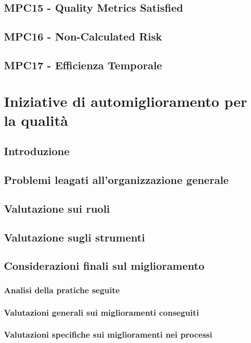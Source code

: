 \documentclass[italian,12pt]{article} %
\begin{document}
\subsection{MPC15 - Quality Metrics Satisfied}

\subsection{MPC16 - Non-Calculated Risk}

\subsection{MPC17 - Efficienza Temporale}

\section{Iniziative di automiglioramento per la qualità}

\subsection{Introduzione}

\subsection{Problemi leagati all’organizzazione generale}

\subsection{Valutazione sui ruoli}

\subsection*{Valutazione sugli strumenti}

\subsection{Considerazioni finali sul miglioramento}

\subsubsection{Analisi della pratiche seguite}

\subsubsection{Valutazioni generali sui miglioramenti conseguiti}

\subsubsection{Valutazioni specifiche sui miglioramenti nei processi}


\end{document}
